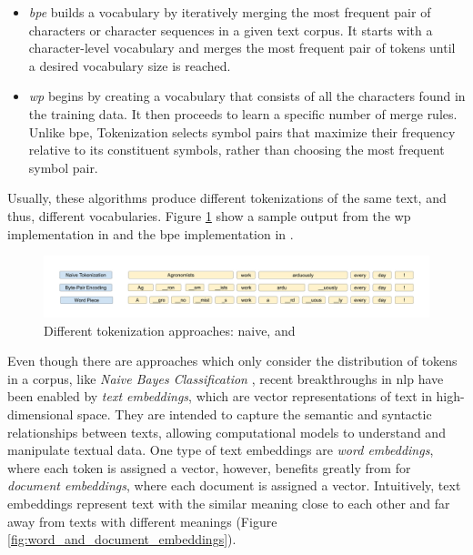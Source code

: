 \begin{itemize}
    \item \emph{\gls{bpe}}  builds a vocabulary by iteratively merging the most frequent pair of characters or character sequences in a given text corpus. It starts with a character-level vocabulary and merges the most frequent pair of tokens until a desired vocabulary size is reached.
    \item \emph{\gls{wp}}  begins by creating a vocabulary that consists of all the characters found in the training data. It then proceeds to learn a specific number of merge rules. Unlike \gls{bpe}, \wordpiece{} Tokenization selects symbol pairs that maximize their frequency relative to its constituent symbols, rather than choosing the most frequent symbol pair.
\end{itemize}

Usually, these algorithms produce different tokenizations of the same text, and thus, different vocabularies. Figure \ref{fig:02_tokenizer_comparison} show a sample output from the \gls{wp} implementation in  and the \gls{bpe} implementation in .

\begin{figure}
    \centering
    \includegraphics[width=\textwidth]{Figures/02/02_Tokenizer_comparison.png}
    \caption{Different tokenization approaches: naive, \wordpiece{} and \bpe}
    \label{fig:02_tokenizer_comparison}
\end{figure}

Even though there are \textclassification{} approaches which only consider the distribution of tokens in a corpus, like \emph{Naive Bayes Classification} , recent breakthroughs in \gls{nlp} have been enabled by \emph{text embeddings}, which are vector representations of text in high-dimensional space. They are intended to capture the semantic and syntactic relationships between texts, allowing computational models to understand and manipulate textual data. One type of text embeddings are \emph{word embeddings}, where each token is assigned a vector, however, \textclassification{} benefits greatly from for \emph{document embeddings}, where each document is assigned a vector. Intuitively, text embeddings represent text with the similar meaning close to each other and far away from texts with different meanings (Figure \ref{fig:word_and_document_embeddings}).

